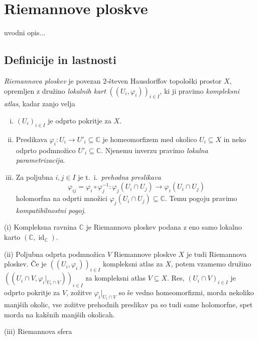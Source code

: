 \documentclass[mat1]{fmfdelo}
\numberwithin{equation}{section}
\newcommand{\C}{\mathbb C}
\newcommand{\inv}{^{-1}}
\newcommand{\ti}{t.~i.\ }
\DeclareMathOperator{\id}{id}
\theoremstyle{definition}
\begin{document}
\section{Riemannove ploskve} \label{riemannove ploskve}
uvodni opis...
\subsection{Definicije in lastnosti}


\begin{definicija}
    \emph{Riemannova ploskev} je povezan $2$-števen Hausdorffov topološki prostor $X$, opremljen z družino \emph{lokalnih kart} $((U_i, \varphi_i))_{i \in I}$, ki ji pravimo \emph{kompleksni atlas}, kadar zanjo velja
    \begin{enumerate}[(i)]
        \item $(U_i)_{i \in I}$ je odprto pokritje za $X$.
        \item Preslikava $\varphi_i : U_i \to U'_i \subseteq \C$ je homeomorfizem med okolico $U_i \subseteq X$ in neko odprto podmnožico $U'_i \subseteq \C$. Njenemu inverzu pravimo \emph{lokalna parametrizacija}.
        \item Za poljubna $i,j \in I$ je \ti \emph{prehodna preslikava}
        \[
            \varphi_{ij} = \varphi_i \circ \varphi_j\inv : \varphi_j(U_i \cap U_j) \longrightarrow  \varphi_i(U_i \cap U_j)   
        \]
        holomorfna na odprti množici $\varphi_j(U_i \cap U_j) \subseteq \C$. Temu pogoju pravimo \emph{kompatibilnostni pogoj}.
    \end{enumerate}
\end{definicija}

\begin{zgled*}
    (i) Kompleksna ravnina $\C$ je Riemannova ploskev podana z eno samo lokalno karto $(\C, \id_\C)$. 

    (ii) Poljubna odprta podmnožica $V$ Riemannove ploskve $X$ je tudi Riemannova ploskev. Če je $((U_i, \varphi_i))_{i \in I}$ kompleksni atlas za $X$, potem vzamemo družino $((U_i \cap V, \varphi_i|_{U_i \cap V}))_{i \in I}$ za kompleksni atlas $V\subseteq X$. Res, $(U_i \cap V)_{i \in I}$ je odprto pokritje za $V$, zožitve $\varphi_i|_{U_i \cap V}$ so še vedno homeomorfizmi, morda nekoliko manjših okolic, vse zožitve prehodnih preslikav pa so tudi same holomorfne, spet morda na kakšnih manjših okolicah. 
    
    (iii) Riemannova sfera
\end{zgled*}
\end{document}
